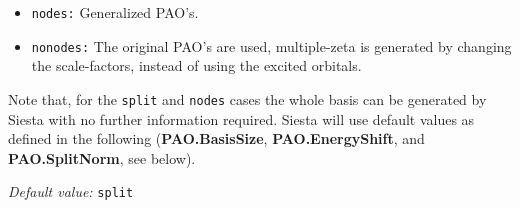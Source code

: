 \documentclass[11pt]{article}
\begin{document}
\begin{description}
\begin{itemize}
\item {\tt nodes:} Generalized PAO's.

\item {\tt nonodes:} 
The original PAO's are used, multiple-zeta is generated
by changing the scale-factors, instead of using the excited orbitals. 

\end{itemize}

\noindent
Note that, for the {\tt split} and {\tt nodes} cases
the whole basis can be generated by {\sc Siesta} with no further information
required. {\sc Siesta} will use default values as defined in the following 
({\bf PAO.BasisSize},
{\bf PAO.EnergyShift}, and {\bf PAO.SplitNorm}, see below).

{\it Default value:} {\tt split}

\end{description}
\end{document}
